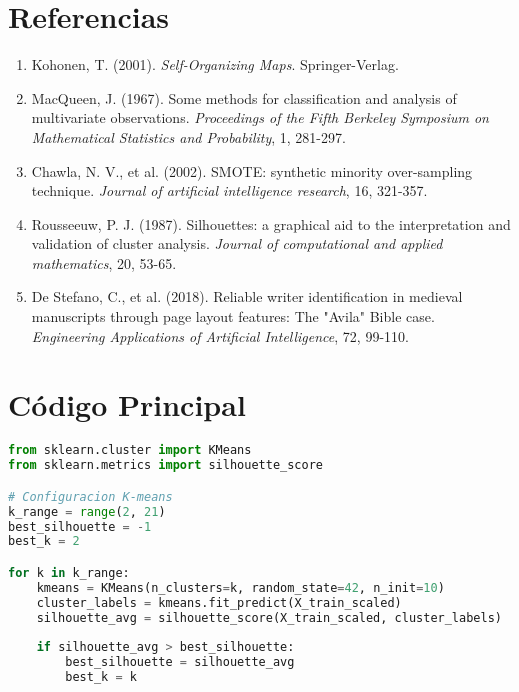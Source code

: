 \documentclass[12pt,a4paper]{article}
\begin{document}
\section{Referencias}

\begin{enumerate}
    \item Kohonen, T. (2001). \textit{Self-Organizing Maps}. Springer-Verlag.
    \item MacQueen, J. (1967). Some methods for classification and analysis of multivariate observations. \textit{Proceedings of the Fifth Berkeley Symposium on Mathematical Statistics and Probability}, 1, 281-297.
    \item Chawla, N. V., et al. (2002). SMOTE: synthetic minority over-sampling technique. \textit{Journal of artificial intelligence research}, 16, 321-357.
    \item Rousseeuw, P. J. (1987). Silhouettes: a graphical aid to the interpretation and validation of cluster analysis. \textit{Journal of computational and applied mathematics}, 20, 53-65.
    \item De Stefano, C., et al. (2018). Reliable writer identification in medieval manuscripts through page layout features: The "Avila" Bible case. \textit{Engineering Applications of Artificial Intelligence}, 72, 99-110.
\end{enumerate}

\appendix

\section{Código Principal}

\begin{lstlisting}[language=Python, caption=Implementación K-means Optimizado]
from sklearn.cluster import KMeans
from sklearn.metrics import silhouette_score

# Configuracion K-means
k_range = range(2, 21)
best_silhouette = -1
best_k = 2

for k in k_range:
    kmeans = KMeans(n_clusters=k, random_state=42, n_init=10)
    cluster_labels = kmeans.fit_predict(X_train_scaled)
    silhouette_avg = silhouette_score(X_train_scaled, cluster_labels)
    
    if silhouette_avg > best_silhouette:
        best_silhouette = silhouette_avg
        best_k = k
\end{lstlisting}
\end{document}
